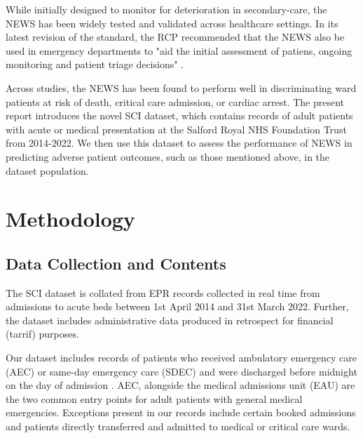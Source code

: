 \documentclass[10pt,journal, compsoc]{IEEEtran}
\begin{document}
While initially designed to monitor for deterioration in secondary-care, the NEWS has been widely tested and validated across healthcare settings. In its latest revision of the standard, the RCP recommended that the NEWS also be used in emergency departments to "aid the initial assessment of patiens, ongoing monitoring and patient triage decisions" \cite[pp.~18]{RCP17}.

Across studies, the NEWS has been found to perform well in discriminating ward patients at risk of death, critical care admission, or cardiac arrest. The present report introduces the novel SCI dataset, which contains records of adult patients with acute or medical presentation at the Salford Royal NHS Foundation Trust from 2014-2022. We then use this dataset to assess the performance of NEWS in predicting adverse patient outcomes, such as those mentioned above, in the dataset population.

\section{Methodology}
\subsection{Data Collection and Contents}
The SCI dataset is collated from EPR records collected in real time from admissions to acute beds between 1st April 2014 and 31st March 2022. Further, the dataset includes administrative data produced in retrospect for financial (tarrif) purposes.

Our dataset includes records of patients who received ambulatory emergency care (AEC) or same-day emergency care (SDEC) and were discharged before midnight on the day of admission \cite{NHS18}. AEC, alongside the medical admissions unit (EAU)  are the two common entry points for adult patients with general medical emergencies. Exceptions present in our records include certain booked admissions and patients directly transferred and admitted to medical or critical care wards.
\end{document}
